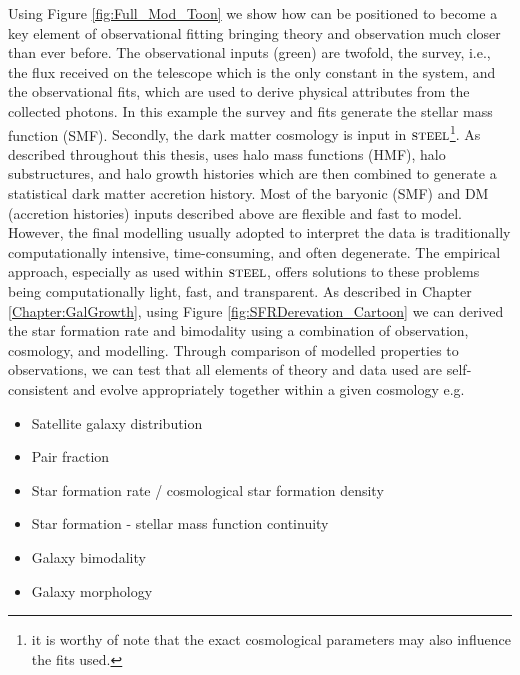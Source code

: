 Using Figure \ref{fig:Full_Mod_Toon} we show how \steel can be positioned to become a key element of observational fitting bringing theory and observation much closer than ever before. \textcolor{MPLgreen}{The observational inputs (green) are twofold, the survey, i.e., the flux received on the telescope which is the only constant in the system, and the observational fits, which are used to derive physical attributes from the collected photons. In this example the survey and fits generate the stellar mass function (SMF).} \textcolor{MPLred}{Secondly, the dark matter cosmology is input in $\textsc{steel}$\footnote{it is worthy of note that the exact cosmological parameters may also influence the fits used.}. As described throughout this thesis, \steel uses halo mass functions (HMF), halo substructures, and halo growth histories which are then combined to generate a statistical dark matter accretion history.} Most of the baryonic (SMF) and DM (accretion histories) inputs described above are flexible and fast to model. \textcolor{MPLblue}{However, the final modelling usually adopted to interpret the data is traditionally computationally intensive, time-consuming, and often degenerate. The empirical approach, especially as used within $\textsc{steel}$, offers solutions to these problems being computationally light, fast, and transparent.} As described in Chapter \ref{Chapter:GalGrowth}, using Figure \ref{fig:SFRDerevation_Cartoon} we can derived the star formation rate and bimodality using a combination of \textcolor{MPLgreen}{observation}, \textcolor{MPLred}{cosmology}, and \textcolor{MPLblue}{modelling}. Through comparison of modelled properties to observations, we can test that all elements of theory and data used are self-consistent and evolve appropriately together within a given cosmology e.g.
\begin{itemize}
    \item Satellite galaxy distribution
    \item Pair fraction
    \item Star formation rate / cosmological star formation density
    \item Star formation - stellar mass function continuity
    \item Galaxy bimodality
    \item Galaxy morphology
\end{itemize}
